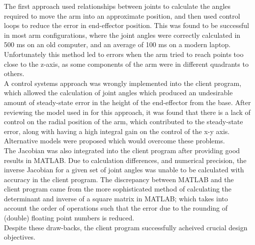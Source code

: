\documentclass[12pt,openany,a4paper]{book}
\begin{document}
The first approach used relationships between joints to calculate the angles required to move the arm into an approximate position, and then used control loops to reduce the error in end-effector position. This was found to be successful in most arm configurations, where the joint angles were correctly calculated in 500 ms on an old computer, and an average of 100 ms on a modern laptop. Unfortunately this method led to errors when the arm tried to reach points too close to the z-axis, as some components of the arm were in different quadrants to others.\\

A control systems approach was wrongly implemented into the client program, which allowed the calculation of joint angles which produced an undesirable amount of steady-state error in the height of the end-effector from the base. After reviewing the model used in for this approach, it was found that there is a lack of control on the radial position of the arm, which contributed to the steady-state error, along with having a high integral gain on the control of the x-y axis. Alternative models were proposed which would overcome these problems.\\

The Jacobian was also integrated into the client program after providing good results in MATLAB. Due to calculation differences, and numerical precision, the inverse Jacobian for a given set of joint angles was unable to be calculated with accuracy in the client program. The discrepancy between MATLAB and the client program came from the more sophisticated method of calculating the determinant and inverse of a square matrix in MATLAB; which takes into account the order of operations such that the error due to the rounding of (double) floating point numbers is reduced.\\

Despite these draw-backs, the client program successfully acheived crucial design objectives.
\end{document}

